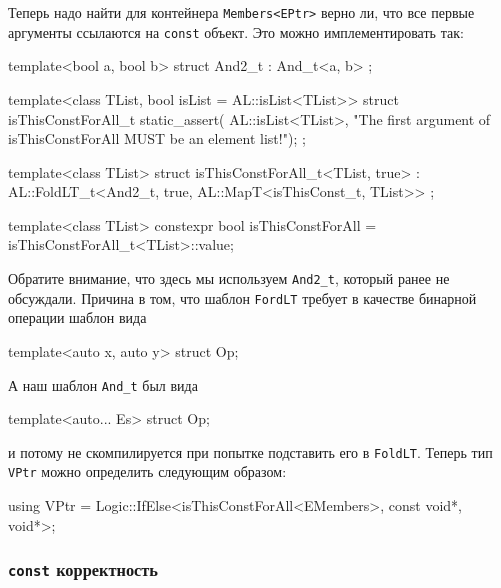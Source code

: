 Теперь надо найти для контейнера \verb"Members<EPtr>" верно ли, что все первые аргументы ссылаются на \verb"const" объект.
Это можно имплементировать так:
\begin{cppcode}
template<bool a, bool b>
struct And2_t : And_t<a, b> {};

template<class TList, bool isList = AL::isList<TList>>
struct isThisConstForAll_t {
  static_assert(
      AL::isList<TList>,
      "The first argument of isThisConstForAll MUST be an element list!");
};

template<class TList>
struct isThisConstForAll_t<TList, true>
    : AL::FoldLT_t<And2_t, true, AL::MapT<isThisConst_t, TList>> {};

template<class TList>
constexpr bool isThisConstForAll = isThisConstForAll_t<TList>::value;
\end{cppcode}
Обратите внимание, что здесь мы используем \verb"And2_t", который ранее  не обсуждали.
Причина в том, что шаблон \verb"FordLT" требует в качестве бинарной операции шаблон вида
\begin{cppcode}
template<auto x, auto y>
struct Op;
\end{cppcode}
А наш шаблон \verb"And_t" был вида
\begin{cppcode}
template<auto... Es>
struct Op;
\end{cppcode}
и потому не скомпилируется при попытке подставить его в \verb"FoldLT".
Теперь тип \verb"VPtr" можно определить следующим образом:
\begin{cppcode}
using VPtr = Logic::IfElse<isThisConstForAll<EMembers>, const void*, void*>;
\end{cppcode}

\subsubsection{\texttt{const} корректность}

